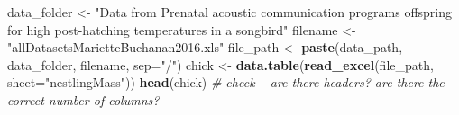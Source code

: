 \documentclass[]{book}
\newenvironment{Shaded}{\begin{snugshade}}{\end{snugshade}}
\newcommand{\KeywordTok}[1]{\textcolor[rgb]{0.13,0.29,0.53}{\textbf{#1}}}
\newcommand{\DataTypeTok}[1]{\textcolor[rgb]{0.13,0.29,0.53}{#1}}
\newcommand{\StringTok}[1]{\textcolor[rgb]{0.31,0.60,0.02}{#1}}
\newcommand{\CommentTok}[1]{\textcolor[rgb]{0.56,0.35,0.01}{\textit{#1}}}
\newcommand{\NormalTok}[1]{#1}
\begin{document}
\begin{Shaded}
\begin{Highlighting}[]
\NormalTok{data_folder <-}\StringTok{ "Data from Prenatal acoustic communication programs offspring for high post-hatching temperatures in a songbird"}
\NormalTok{filename <-}\StringTok{ "allDatasetsMarietteBuchanan2016.xls"}
\NormalTok{file_path <-}\StringTok{ }\KeywordTok{paste}\NormalTok{(data_path, data_folder, filename, }\DataTypeTok{sep=}\StringTok{"/"}\NormalTok{)}
\NormalTok{chick <-}\StringTok{ }\KeywordTok{data.table}\NormalTok{(}\KeywordTok{read_excel}\NormalTok{(file_path, }\DataTypeTok{sheet=}\StringTok{"nestlingMass"}\NormalTok{))}
\KeywordTok{head}\NormalTok{(chick) }\CommentTok{# check -- are there headers? are there the correct number of columns?}
\end{Highlighting}
\end{Shaded}
\end{document}
